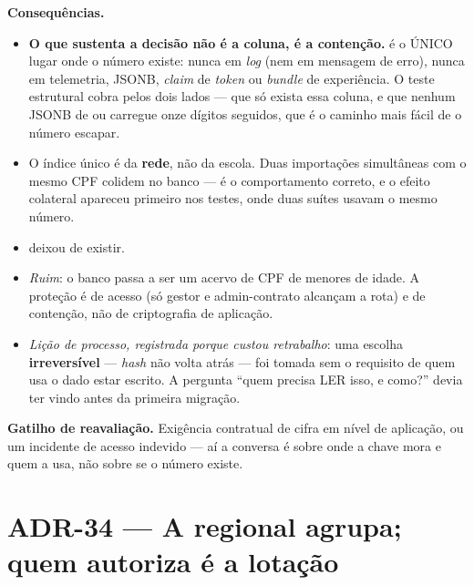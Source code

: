 \textbf{Consequências.}
\begin{itemize}
  \item \textbf{O que sustenta a decisão não é a coluna, é a contenção.}
     é o ÚNICO lugar onde o número existe: nunca em \emph{log} (nem
    em mensagem de erro), nunca em telemetria, JSONB, \emph{claim} de \emph{token}
    ou \emph{bundle} de experiência. O teste estrutural cobra pelos dois lados ---
    que só exista essa coluna, e que nenhum JSONB de  ou
     carregue onze dígitos seguidos, que é o caminho mais fácil de o
    número escapar.
  \item O índice único é da \textbf{rede}, não da escola. Duas importações
    simultâneas com o mesmo CPF colidem no banco --- é o comportamento correto, e
    o efeito colateral apareceu primeiro nos testes, onde duas suítes usavam o
    mesmo número.
  \item {} deixou de existir.
  \item \emph{Ruim}: o banco passa a ser um acervo de CPF de menores de idade.
    A proteção é de acesso (só gestor e admin-contrato alcançam a rota) e de
    contenção, não de criptografia de aplicação.
  \item \emph{Lição de processo, registrada porque custou retrabalho}: uma escolha
    \textbf{irreversível} --- \emph{hash} não volta atrás --- foi tomada sem o
    requisito de quem usa o dado estar escrito. A pergunta \enquote{quem precisa
    LER isso, e como?} devia ter vindo antes da primeira migração.
\end{itemize}

\textbf{Gatilho de reavaliação.} Exigência contratual de cifra em nível de
aplicação, ou um incidente de acesso indevido --- aí a conversa é sobre onde a
chave mora e quem a usa, não sobre se o número existe.

\section{ADR-34 --- A regional agrupa; quem autoriza é a lotação}
\label{adr:nivel-regional}

